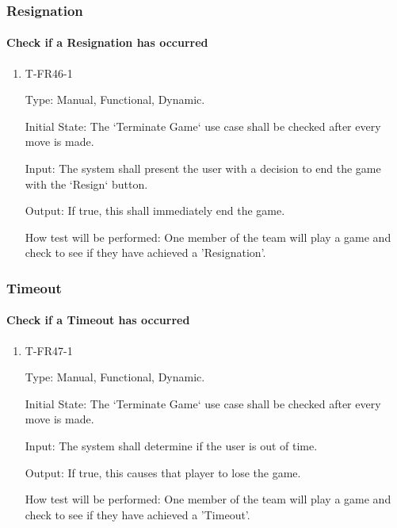 \documentclass[12pt, titlepage]{article}
\begin{document}
\subsubsection{Resignation}

    \paragraph{Check if a Resignation has occurred}

            \begin{enumerate}

            \item{T-FR46-1\\}

                Type: Manual, Functional, Dynamic.
                					
                Initial State: The ‘Terminate Game‘ use case shall be checked after every move is made.
                					
                Input: The system shall present the user with a decision to end the game with the ‘Resign‘ button.
                					
                Output: If true, this shall immediately end the game.

                How test will be performed: One member of the team will play a game and check to see if they have achieved a 'Resignation'.

            \end{enumerate}

\subsubsection{Timeout}

    \paragraph{Check if a Timeout has occurred}

            \begin{enumerate}

            \item{T-FR47-1\\}

                Type: Manual, Functional, Dynamic.
                					
                Initial State: The ‘Terminate Game‘ use case shall be checked after every move is made.
                					
                Input: The system shall determine if the user is out of time.
                					
                Output: If true, this causes that player to lose the game.

                How test will be performed: One member of the team will play a game and check to see if they have achieved a 'Timeout'.

            \end{enumerate}
\end{document}
